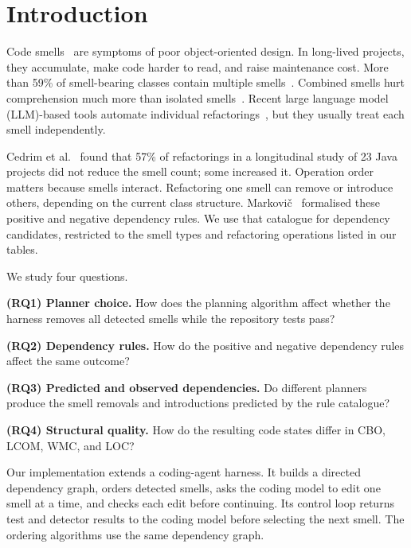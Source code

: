 \documentclass[conference]{IEEEtran}
\begin{document}
\section{Introduction}

Code smells~\cite{Fowler1999} are symptoms of poor object-oriented design.
In long-lived projects, they accumulate, make code harder to read, and raise
maintenance cost.
More than 59\% of smell-bearing classes contain multiple
smells~\cite{palomba2018diffuseness}. Combined smells hurt comprehension much
more than isolated smells~\cite{abbes2011empirical}.
Recent large language model (LLM)-based tools automate individual
refactorings~\cite{10.1145/3691620.3695508,liang2025smelldetector}, but they
usually treat each smell independently.

Cedrim et al.~\cite{cedrim2017} found that 57\% of refactorings in a
longitudinal study of 23 Java projects did not reduce the smell count; some
increased it.
Operation order matters because smells interact. Refactoring one smell can
remove or introduce others, depending on the current class structure.
Markovič~\cite{markovic2016refaktorovanie} formalised these positive and
negative dependency rules.
We use that catalogue for dependency candidates, restricted to the smell types
and refactoring operations listed in our tables.

We study four questions.

\textbf{(RQ1) Planner choice.} How does the planning algorithm affect whether
the harness removes all detected smells while the repository tests pass?

\textbf{(RQ2) Dependency rules.} How do the positive and negative dependency
rules affect the same outcome?

\textbf{(RQ3) Predicted and observed dependencies.} Do different planners
produce the smell removals and introductions predicted by the rule catalogue?

\textbf{(RQ4) Structural quality.} How do the resulting code states differ in
CBO, LCOM, WMC, and LOC?

Our implementation extends a coding-agent harness. It builds a directed
dependency graph, orders detected smells, asks the coding model to edit one
smell at a time, and checks each edit before continuing. Its control loop
returns test and detector results to the coding model before selecting the next
smell. The ordering algorithms use the same dependency graph.
\end{document}
